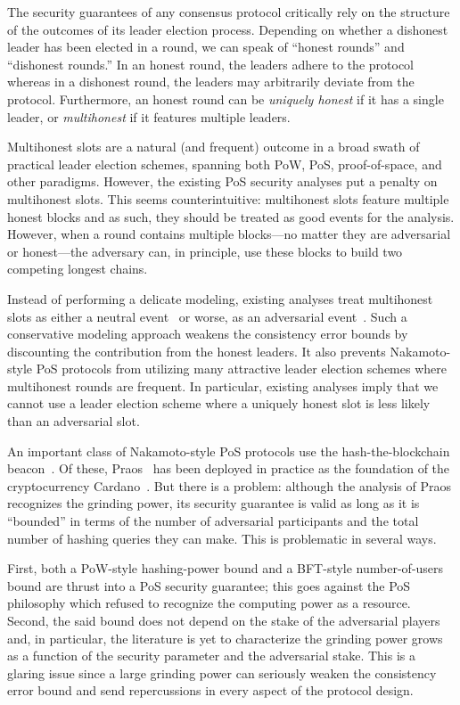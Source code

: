 The security guarantees of any consensus protocol 
critically rely on the structure 
of the outcomes of its leader election process. 
Depending on whether a dishonest leader has been elected in a round, 
we can speak of ``honest rounds'' and ``dishonest rounds.'' 
In an honest round, the leaders adhere to the protocol whereas 
in a dishonest round, the leaders may arbitrarily deviate from the protocol. 
Furthermore, an honest round can be \emph{uniquely honest} if it has a single leader, 
or \emph{multihonest} if it features multiple leaders. 

Multihonest slots are a natural (and frequent) outcome 
in a broad swath of practical leader election schemes, 
spanning both PoW, PoS, proof-of-space, and other paradigms. 
However, the existing PoS security analyses put a penalty on multihonest slots. 
This seems counterintuitive: multihonest slots feature multiple honest blocks 
and as such, they should be treated as good events for the analysis. 
However, when a round contains multiple blocks---no matter they are adversarial or honest---the adversary can, 
in principle, use these blocks to build two competing longest chains. 

Instead of performing a delicate modeling, 
existing analyses treat multihonest slots as either a neutral event~\cite{SnowWhite,Sleepy} 
or worse, as an adversarial event~\cite{Ouroboros,Praos,Genesis}. 
Such a conservative modeling approach weakens the consistency error bounds 
by discounting the contribution from the honest leaders. 
It also prevents Nakamoto-style PoS protocols from 
utilizing many attractive leader election schemes 
where multihonest rounds are frequent. 
In particular, existing analyses imply 
that we cannot use a leader election scheme 
where a uniquely honest slot is less likely than an adversarial slot.



An important class of Nakamoto-style PoS protocols use the hash-the-blockchain beacon~\cite{SnowWhite,Sleepy,Praos,Genesis}.
Of these, Praos~\cite{Praos} has been deployed in practice 
as the foundation of the cryptocurrency Cardano~\cite{Cardano}. 
But there is a problem: 
although the analysis of Praos recognizes the grinding power, 
its security guarantee is valid as long as it is ``bounded'' 
in terms of the number of adversarial participants and 
the total number of hashing queries they can make. 
This is problematic in several ways.

First, both a PoW-style hashing-power bound 
and a BFT-style number-of-users bound are thrust into 
a PoS security guarantee; 
this goes against the PoS philosophy which 
refused to recognize the computing power as a resource. 
Second, 
the said bound does not depend on the stake of the adversarial players 
and, in particular, 
the literature is yet to characterize the grinding power grows as a function 
of the security parameter and the adversarial stake. 
This is a glaring issue since 
a large grinding power can seriously weaken the consistency error bound and 
send repercussions in every aspect of the protocol design. 


